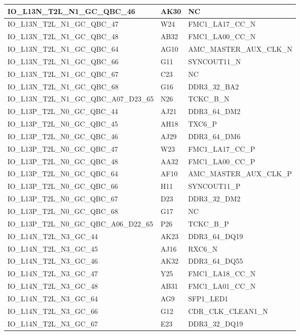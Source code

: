 \begin{footnotesize}
\begin{longtable}{|p{7cm}|p{1cm}|p{5cm}|}
IO\_L13N\_T2L\_N1\_GC\_QBC\_46	&	AK30	&	NC	\\ \hline
IO\_L13N\_T2L\_N1\_GC\_QBC\_47	&	W24	&	FMC1\_LA17\_CC\_N	\\ \hline
IO\_L13N\_T2L\_N1\_GC\_QBC\_48	&	AB32	&	FMC1\_LA00\_CC\_N	\\ \hline
IO\_L13N\_T2L\_N1\_GC\_QBC\_64	&	AG10	&	AMC\_MASTER\_AUX\_CLK\_N	\\ \hline
IO\_L13N\_T2L\_N1\_GC\_QBC\_66	&	G11	&	SYNCOUT11\_N	\\ \hline
IO\_L13N\_T2L\_N1\_GC\_QBC\_67	&	C23	&	NC	\\ \hline
IO\_L13N\_T2L\_N1\_GC\_QBC\_68	&	G16	&	DDR3\_32\_BA2	\\ \hline
IO\_L13N\_T2L\_N1\_GC\_QBC\_A07\_D23\_65	&	N26	&	TCKC\_B\_N	\\ \hline
IO\_L13P\_T2L\_N0\_GC\_QBC\_44	&	AJ21	&	DDR3\_64\_DM2	\\ \hline
IO\_L13P\_T2L\_N0\_GC\_QBC\_45	&	AH18	&	TXC6\_P	\\ \hline
IO\_L13P\_T2L\_N0\_GC\_QBC\_46	&	AJ29	&	DDR3\_64\_DM6	\\ \hline
IO\_L13P\_T2L\_N0\_GC\_QBC\_47	&	W23	&	FMC1\_LA17\_CC\_P	\\ \hline
IO\_L13P\_T2L\_N0\_GC\_QBC\_48	&	AA32	&	FMC1\_LA00\_CC\_P	\\ \hline
IO\_L13P\_T2L\_N0\_GC\_QBC\_64	&	AF10	&	AMC\_MASTER\_AUX\_CLK\_P	\\ \hline
IO\_L13P\_T2L\_N0\_GC\_QBC\_66	&	H11	&	SYNCOUT11\_P	\\ \hline
IO\_L13P\_T2L\_N0\_GC\_QBC\_67	&	D23	&	DDR3\_32\_DM2	\\ \hline
IO\_L13P\_T2L\_N0\_GC\_QBC\_68	&	G17	&	NC	\\ \hline
IO\_L13P\_T2L\_N0\_GC\_QBC\_A06\_D22\_65	&	P26	&	TCKC\_B\_P	\\ \hline
IO\_L14N\_T2L\_N3\_GC\_44	&	AK23	&	DDR3\_64\_DQ19	\\ \hline
IO\_L14N\_T2L\_N3\_GC\_45	&	AJ16	&	RXC6\_N	\\ \hline
IO\_L14N\_T2L\_N3\_GC\_46	&	AK32	&	DDR3\_64\_DQ55	\\ \hline
IO\_L14N\_T2L\_N3\_GC\_47	&	Y25	&	FMC1\_LA18\_CC\_N	\\ \hline
IO\_L14N\_T2L\_N3\_GC\_48	&	AB31	&	FMC1\_LA01\_CC\_N	\\ \hline
IO\_L14N\_T2L\_N3\_GC\_64	&	AG9	&	SFP1\_LED1	\\ \hline
IO\_L14N\_T2L\_N3\_GC\_66	&	G12	&	CDR\_CLK\_CLEAN1\_N	\\ \hline
IO\_L14N\_T2L\_N3\_GC\_67	&	E23	&	DDR3\_32\_DQ19	\\ \hline

\end{longtable}
\end{footnotesize}
